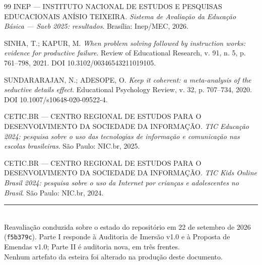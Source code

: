 \documentclass[11pt,a4paper]{article}
\begin{document}
\begin{thebibliography}{99}
INEP --- INSTITUTO NACIONAL DE ESTUDOS E PESQUISAS EDUCACIONAIS ANÍSIO TEIXEIRA.
\emph{Sistema de Avaliação da Educação Básica --- Saeb 2025: resultados}.
Brasília: Inep/MEC, 2026.

SINHA, T.; KAPUR, M.
\emph{When problem solving followed by instruction works: evidence for productive failure}.
Review of Educational Research, v. 91, n. 5, p. 761--798, 2021.
DOI 10.3102/00346543211019105.

SUNDARARAJAN, N.; ADESOPE, O.
\emph{Keep it coherent: a meta-analysis of the seductive details effect}.
Educational Psychology Review, v. 32, p. 707--734, 2020.
DOI 10.1007/s10648-020-09522-4.

CETIC.BR --- CENTRO REGIONAL DE ESTUDOS PARA O DESENVOLVIMENTO DA SOCIEDADE DA INFORMAÇÃO.
\emph{TIC Educação 2024: pesquisa sobre o uso das tecnologias de informação e comunicação nas
escolas brasileiras}. São Paulo: NIC.br, 2025.

CETIC.BR --- CENTRO REGIONAL DE ESTUDOS PARA O DESENVOLVIMENTO DA SOCIEDADE DA INFORMAÇÃO.
\emph{TIC Kids Online Brasil 2024: pesquisa sobre o uso da Internet por crianças e adolescentes
no Brasil}. São Paulo: NIC.br, 2024.

\end{thebibliography}

\vspace{1cm}
\begin{center}
{\color{BorderGray}\rule{0.6\textwidth}{0.6pt}}\\[0.4cm]
{\small\color{Charcoal}
Reavaliação conduzida sobre o estado do repositório em 22 de setembro de 2026
(\texttt{f5b379c}). Parte I responde à Auditoria de Imersão v1.0 e à Proposta de Emendas v1.0;
Parte II é auditoria nova, em três frentes.\\
Nenhum artefato da esteira foi alterado na produção deste documento.}
\end{center}
\end{document}
